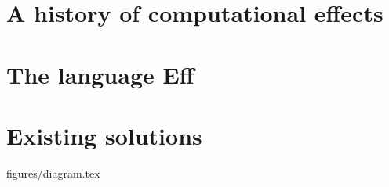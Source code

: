 \documentclass[class=article, crop=false]{standalone}
\begin{document}
\section{A history of computational effects}
\section{The language Eff}
\section{Existing solutions}

{figures/diagram.tex}
\end{document}
